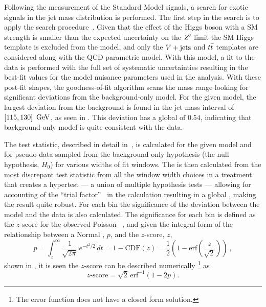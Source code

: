 Following the measurement of the Standard Model signals, a search for exotic signals in the \largeR jet mass distribution is performed.
The first step in the search is to apply the \BumpHunter{} search procedure~\cite{Aaltonen:2008vt,Choudalakis:2011qn}.
Given that the effect of the Higgs boson with a SM strength is smaller than the expected uncertainty on the $Z'$ limit the SM Higgs template is excluded from the model, and only the $V + \text{jets}$ and $t\bar{t}$ templates are considered along with the QCD parametric model.
With this model, a fit to the data is performed with the full set of systematic uncertainties resulting in the best-fit values for the model nuisance parameters used in the analysis.
With these post-fit shapes, the \BumpHunter{} goodness-of-fit algorithm scans the mass range looking for significant deviations from the background-only model.
For the given model, the largest deviation from the background is found in the \largeR jet mass interval of $\left[115,130\right]~\mathrm{GeV}$, as seen in .
This deviation has a \BumpHunter{} global \pvalue{} of $0.54$, indicating that background-only model is quite consistent with the data.

The \BumpHunter{} test statistic, described in detail in~\cite{Choudalakis:2011qn}, is calculated for the given model and for pseudo-data sampled from the background only hypothesis (the null hypothesis, $H_{0}$) for various widths of fit windows.
The \BumpHunter{} \pvalue{} is then calculated from the most discrepant test statistic from all the window width choices in a treatment that creates a hypertest --- a union of multiple hypothesis tests --- allowing for accounting of the ``trial factor''~\cite{Gross:2010qma} in the calculation resulting in a global \pvalue{}, making the result quite robust.
For each bin the significance of the deviation between the model and the data is also calculated.
The significance for each bin is defined as the $z$-score for the observed Poisson \pvalue{}~\cite{Choudalakis:2012}, and given the integral form of the relationship between a Normal \pvalue{}, $p$, and the $z$-score, $z$,
\[
 p = \int_{z}^{\infty} \frac{1}{\sqrt{2\pi}}\,e^{-t^2/2}\,dt = 1 - \mathrm{CDF}\left(z\right) = \frac{1}{2}\left(1 - \mathrm{erf}\left(\frac{z}{\sqrt{2}}\right)\right)\,,
\]
shown in , it is seen the $z$-score can be described numerically%
\footnote{The error function does not have a closed form solution.}
as
\[
 z\textrm{-score} = \sqrt{2}\, \mathrm{erf}^{-1}\left(1-2p\right).
\]

